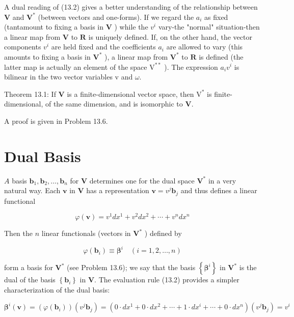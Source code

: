 \documentclass[10pt]{article}
\begin{document}
A dual reading of (13.2) gives a better understanding of the relationship between $\mathbf{V}$ and $\mathbf{V}^{*}$ (between vectors and one-forms). If we regard the $a_{i}$ as fixed (tantamount to fixing a basis in $\mathbf{V}$ ) while the $v^{i}$ vary-the "normal" situation-then a linear map from $\mathbf{V}$ to $\mathbf{R}$ is uniquely defined. If, on the other hand, the vector components $v^{i}$ are held fixed and the coefficients $a_{i}$ are allowed to vary (this amounts to fixing a basis in $\mathbf{V}^{*}$ ), a linear map from $\mathbf{V}^{*}$ to $\mathbf{R}$ is defined (the latter map is actually an element of the space $\mathrm{V}^{* *}$ ). The expression $a_{i} v^{i}$ is bilinear in the two vector variables $\mathrm{v}$ and $\omega$.

Theorem 13.1: If $\mathbf{V}$ is a finite-dimensional vector space, then $\mathrm{V}^{*}$ is finite-dimensional, of the same dimension, and is isomorphic to $\mathbf{V}$.

A proof is given in Problem 13.6.

\section*{Dual Basis}
$A$ basis $\mathbf{b}_{1}, \mathbf{b}_{2}, \ldots, \mathbf{b}_{n}$ for $\mathbf{V}$ determines one for the dual space $\mathbf{V}^{*}$ in a very natural way. Each $\mathbf{v}$ in $\mathbf{V}$ has a representation $\mathbf{v}=v^{j} \mathbf{b}_{j}$ and thus defines a linear functional


\begin{equation*}
\varphi(\mathbf{v})=v^{1} d x^{1}+v^{2} d x^{2}+\cdots+v^{n} d x^{n} \tag{13.3}
\end{equation*}


Then the $n$ linear functionals (vectors in $\mathbf{V}^{*}$ ) defined by


\begin{equation*}
\varphi\left(\mathbf{b}_{i}\right) \equiv \boldsymbol{\beta}^{i} \quad(i=1,2, \ldots, n) \tag{13.4a}
\end{equation*}


form a basis for $\mathbf{V}^{*}$ (see Problem 13.6); we say that the basis $\left\{\boldsymbol{\beta}^{i}\right\}$ in $\mathbf{V}^{*}$ is the dual of the basis $\left\{\mathbf{b}_{i}\right\}$ in $\mathbf{V}$. The evaluation rule (13.2) provides a simpler characterization of the dual basis:


\begin{equation*}
\boldsymbol{\beta}^{i}(\mathbf{v})=\left(\varphi\left(\mathbf{b}_{i}\right)\right)\left(v^{j} \mathbf{b}_{j}\right)=\left(0 \cdot d x^{1}+0 \cdot d x^{2}+\cdots+1 \cdot d x^{i}+\cdots+0 \cdot d x^{n}\right)\left(v^{j} \mathbf{b}_{j}\right)=v^{i} \tag{13.4b}
\end{equation*}
\end{document}

